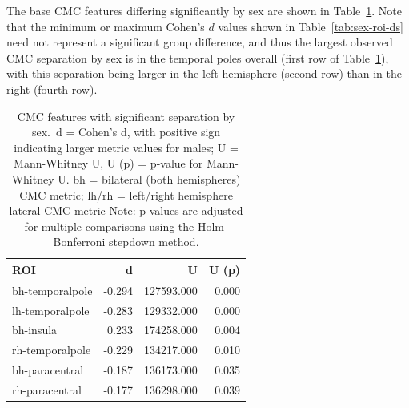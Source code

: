 \documentclass{article}
\newcommand{\CMC}{\(\text{CMC}\) }
\begin{document}
The base \CMC features differing significantly by sex are shown in
Table~\ref{tab:sig-cmc-sex}. Note that the minimum or maximum Cohen's \(d\)
values shown in Table~\ref{tab:sex-roi-ds} need not represent a significant
group difference, and thus the largest observed \CMC separation by sex is in
the temporal poles overall (first row of Table~\ref{tab:sig-cmc-sex}), with
this separation being larger in the left hemisphere (second row) than in the
right (fourth row).


\begin{table}[H]
\centering
\caption{CMC features with significant separation by sex.\
d = Cohen's d, with positive sign indicating larger metric values for males;
U = Mann-Whitney U, U (p) = p-value for Mann-Whitney U.
bh = bilateral (both hemispheres) CMC metric;
lh/rh = left/right hemisphere lateral CMC metric
Note: p-values are adjusted for multiple comparisons using the
Holm-Bonferroni stepdown method.} \label{tab:sig-cmc-sex}
\begin{tabular}{lrrr}
	\toprule
	ROI & d & U & U (p) \\
	\midrule
	bh-temporalpole & -0.294 & 127593.000 & 0.000 \\
	lh-temporalpole & -0.283 & 129332.000 & 0.000 \\
	bh-insula       &  0.233 & 174258.000 & 0.004 \\
	rh-temporalpole & -0.229 & 134217.000 & 0.010 \\
	bh-paracentral  & -0.187 & 136173.000 & 0.035 \\
	rh-paracentral  & -0.177 & 136298.000 & 0.039 \\
	\bottomrule
\end{tabular}
\footnotesize
\normalsize
\end{table}

\end{document}
